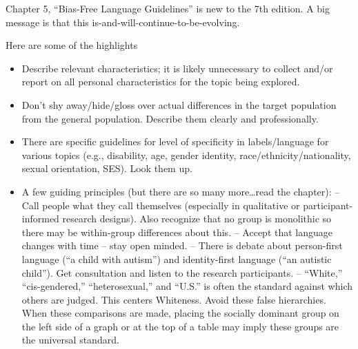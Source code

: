 \documentclass[
  english,
]{book}
\providecommand{\tightlist}{%
  \setlength{\itemsep}{0pt}\setlength{\parskip}{0pt}}
\begin{document}
Chapter 5, ``Bias-Free Language Guidelines'' is new to the 7th edition. A big message is that this is-and-will-continue-to-be-evolving.

Here are some of the highlights

\begin{itemize}
\tightlist
\item
  Describe relevant characteristics; it is likely unnecessary to collect and/or report on all personal characteristics for the topic being explored.
\item
  Don't shy away/hide/gloss over actual differences in the target population from the general population. Describe them clearly and professionally.
\item
  There are specific guidelines for level of specificity in labels/language for various topics (e.g., disability, age, gender identity, race/ethnicity/nationality, sexual orientation, SES). Look them up.
\item
  A few guiding principles (but there are so many more\ldots read the chapter):
  -- Call people what they call themselves (especially in qualitative or participant-informed research designs). Also recognize that no group is monolithic so there may be within-group differences about this.
  -- Accept that language changes with time -- stay open minded.
  -- There is debate about person-first language (``a child with autism'') and identity-first language (``an autistic child''). Get consultation and listen to the research participants.
  -- ``White,'' ``cis-gendered,'' ``heterosexual,'' and ``U.S.'' is often the standard against which others are judged. This centers Whiteness. Avoid these false hierarchies. When these comparisons are made, placing the socially dominant group on the left side of a graph or at the top of a table may imply these groups are the universal standard.
\end{itemize}
\end{document}

